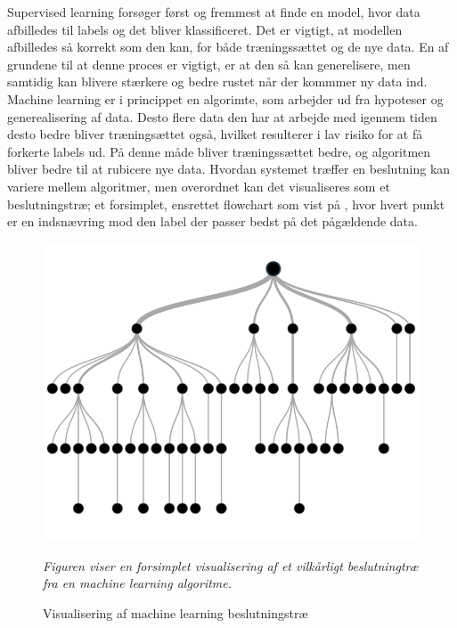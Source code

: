 Supervised learning forsøger først og fremmest at finde en model, hvor data afbilledes til labels og det bliver klassificeret. Det er vigtigt, at modellen afbilledes så korrekt som den kan, for både træningssættet og de nye data. En af grundene til at denne proces er vigtigt, er at den så kan generelisere, men samtidig kan blivere stærkere og bedre rustet når der kommmer ny data ind. Machine learning er i princippet en algorimte, som arbejder ud fra hypoteser og generealisering af data. Desto flere data den har at arbejde med igennem tiden desto bedre bliver træningsættet også, hvilket resulterer i lav risiko for at få forkerte labels ud. På denne måde bliver træningssættet bedre, og algoritmen bliver bedre til at rubicere nye data.\cite{DIKU2010} Hvordan systemet træffer en beslutning kan variere mellem algoritmer, men overordnet kan det visualiseres som et beslutningstræ; et forsimplet, ensrettet flowchart som vist på , hvor hvert punkt er en indsnævring mod den label der passer bedst på det pågældende data.

\begin{figure}[H]
	\centering
	\includegraphics[scale=.4]{figures/dt.png}
	\flushleft 
	\caption{Visualisering af machine learning beslutningstræ}
	\label{dt}
	\flushleft
	\textit{Figuren viser en forsimplet visualisering af et vilkårligt beslutningtræ fra en machine learning algoritme.}
\end{figure}

